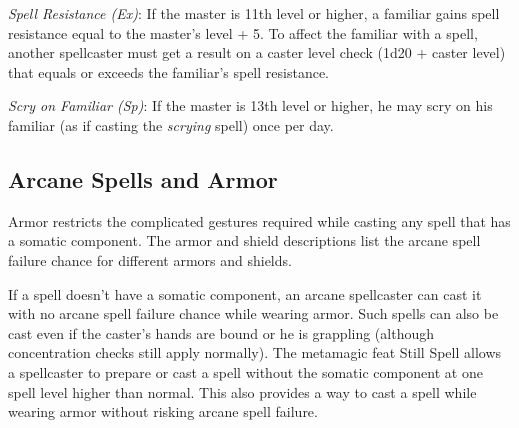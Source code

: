 \textit{Spell Resistance (Ex)}: If the master is 11th level or higher, a familiar gains spell resistance equal to the master's level + 5. To affect the familiar with a spell, another spellcaster must get a result on a caster level check (1d20 + caster level) that equals or exceeds the familiar's spell resistance.
				
\textit{Scry on Familiar (Sp)}: If the master is 13th level or higher, he may scry on his familiar (as if casting the \textit{scrying }spell) once per day.
				
\subsection{Arcane Spells and Armor}

				
Armor restricts the complicated gestures required while casting any spell that has a somatic component. The armor and shield descriptions list the arcane spell failure chance for different armors and shields.
				
If a spell doesn't have a somatic component, an arcane spellcaster can cast it with no arcane spell failure chance while wearing armor. Such spells can also be cast even if the caster's hands are bound or he is grappling (although concentration checks still apply normally). The metamagic feat Still Spell allows a spellcaster to prepare or cast a spell without the somatic component at one spell level higher than normal. This also provides a way to cast a spell while wearing armor without risking arcane spell failure.
        	